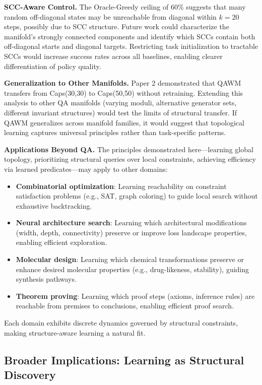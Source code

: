 \textbf{SCC-Aware Control.} The Oracle-Greedy ceiling of 60\% suggests that many random off-diagonal states may be unreachable from diagonal within $k=20$ steps, possibly due to SCC structure. Future work could characterize the manifold's strongly connected components and identify which SCCs contain both off-diagonal starts and diagonal targets. Restricting task initialization to tractable SCCs would increase success rates across all baselines, enabling clearer differentiation of policy quality.

\textbf{Generalization to Other Manifolds.} Paper 2 demonstrated that QAWM transfers from Caps(30,30) to Caps(50,50) without retraining. Extending this analysis to other QA manifolds (varying moduli, alternative generator sets, different invariant structures) would test the limits of structural transfer. If QAWM generalizes across manifold families, it would suggest that topological learning captures universal principles rather than task-specific patterns.

\textbf{Applications Beyond QA.} The principles demonstrated here—learning global topology, prioritizing structural queries over local constraints, achieving efficiency via learned predicates—may apply to other domains:

\begin{itemize}
\item \textbf{Combinatorial optimization}: Learning reachability on constraint satisfaction problems (e.g., SAT, graph coloring) to guide local search without exhaustive backtracking.
\item \textbf{Neural architecture search}: Learning which architectural modifications (width, depth, connectivity) preserve or improve loss landscape properties, enabling efficient exploration.
\item \textbf{Molecular design}: Learning which chemical transformations preserve or enhance desired molecular properties (e.g., drug-likeness, stability), guiding synthesis pathways.
\item \textbf{Theorem proving}: Learning which proof steps (axioms, inference rules) are reachable from premises to conclusions, enabling efficient proof search.
\end{itemize}

Each domain exhibits discrete dynamics governed by structural constraints, making structure-aware learning a natural fit.

\subsection{Broader Implications: Learning as Structural Discovery}

